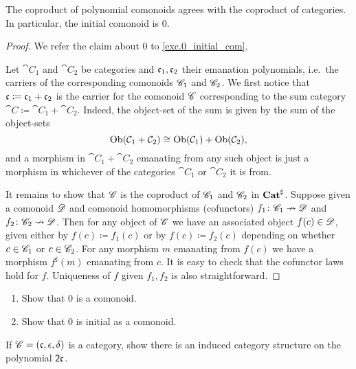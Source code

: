 \documentclass[DynamicalBook]{subfiles}
\begin{document}
\begin{proposition}[Niu]
The coproduct of polynomial comonoids agrees with the coproduct of categories. In particular, the initial comonoid is $0$.
\end{proposition}
\begin{proof}
We refer the claim about $0$ to \cref{exc.0_initial_com}.

Let $\cat{C}_1$ and $\cat{C}_2$ be categories and $\mathfrak{c}_1,\mathfrak{c}_2$ their emanation polynomials, i.e.\ the carriers of the corresponding comonoids $\mathscr{C}_1$ and $\mathscr{C}_2$. We first notice that $\mathfrak{c}\coloneqq\mathfrak{c}_1+\mathfrak{c}_2$ is the carrier for the comonoid $\mathscr{C}$ corresponding to the sum category $\cat{C}\coloneqq\cat{C}_1+\cat{C}_2$. Indeed, the object-set of the sum is given by the sum of the object-sets
\[
	\operatorname{Ob}(\mathcal{C}_1+\mathcal{C}_2)
  \cong
  \operatorname{Ob}(\mathcal{C}_1)+\operatorname{Ob}(\mathcal{C}_2),
\]
and a morphism in $\cat{C}_1+\cat{C}_2$ emanating from any such object is just a morphism in whichever of the categories $\cat{C_1}$ or $\cat{C}_2$ it is from. 

It remains to show that $\mathscr{C}$ is the coproduct of $\mathscr{C}_1$ and $\mathscr{C}_2$ in $\textbf{Cat}^\sharp$. Suppose given a comonoid $\mathscr{D}$ and comonoid homomorphisms (cofunctors) $f_1\colon\mathscr{C}_1\nrightarrow\mathscr{D}$ and $f_2\colon\mathscr{C}_2\nrightarrow\mathscr{D}$. Then for any object of $\mathscr{C}$ we have an associated object $f(c)\in\mathscr{D}$, given either by $f(c)\coloneqq f_1(c)$ or by $f(c)\coloneqq f_2(c)$ depending on whether $c\in\mathscr{C}_1$ or $c\in\mathscr{C}_2$. For any morphism $m$ emanating from $f(c)$ we have a morphism $f^\sharp(m)$ emanating from $c$. It is easy to check that the cofunctor laws hold for $f$. Uniqueness of $f$ given $f_1,f_2$ is also straightforward.
\end{proof}

\begin{exercise}\label{exc.0_initial_com}
\begin{enumerate}
	\item Show that $0$ is a comonoid.
	\item Show that $0$ is initial as a comonoid.
\qedhere
\end{enumerate}
\end{exercise}

\begin{exercise}
If $\mathscr{C}=(\mathfrak{c},\epsilon,\delta)$ is a category, show there is an induced category structure on the polynomial $\textsf{2}\mathfrak{c}$.
\end{exercise}
\end{document}

